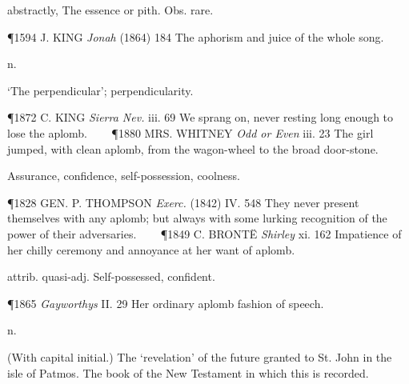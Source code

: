 \begin{description}[wide, labelwidth=!, labelindent=0pt]
\begin{myenumerate}
 abstractly, The essence or pith. Obs. rare.

\P 1594 J. KING  \textit{Jonah} (1864) 184 The aphorism and juice of the whole song.
\end{myenumerate}


 n.

\noindent {}

\vspace{-0.3cm}

\begin{myenumerate}

 ‘The perpendicular’; perpendicularity.

\P 1872 C. KING  \textit{Sierra Nev.} iii. 69 We sprang on, never resting long enough to lose the aplomb.    
\P 1880 MRS. WHITNEY  \textit{Odd or Even} iii. 23 The girl jumped, with clean aplomb, from the wagon-wheel to the broad door-stone.

 Assurance, confidence, self-possession, coolness.

\P 1828 GEN. P. THOMPSON  \textit{Exerc.} (1842) IV. 548 They never present themselves with any aplomb; but always with some lurking recognition of the power of their adversaries.    
\P 1849 C. BRONTË  \textit{Shirley} xi. 162 Impatience of her chilly ceremony and annoyance at her want of aplomb.

 attrib. quasi-adj. Self-possessed, confident.

\P 1865 \textit{Gayworthys}  II. 29 Her ordinary aplomb fashion of speech.
\end{myenumerate}


 n.

\noindent {}

\vspace{-0.3cm}

\begin{myenumerate}

 (With capital initial.) The ‘revelation’ of the future granted to St. John in the isle of Patmos. The book of the New Testament in which this is recorded.


\end{myenumerate}
\end{description}
